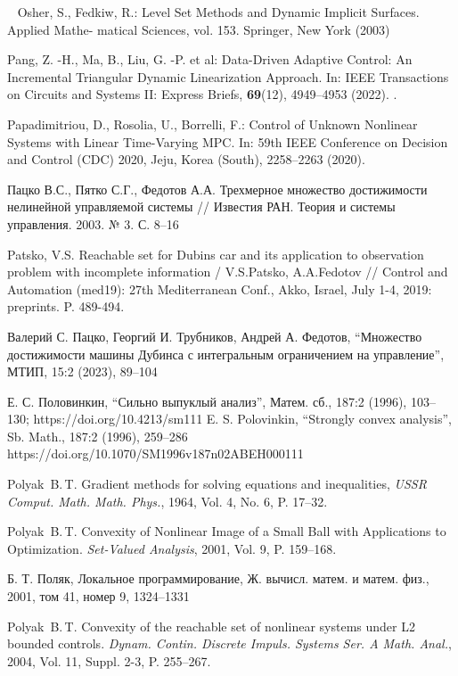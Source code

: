 \documentclass[../main.tex]{subfiles}
\begin{document}
\begin{thebibliography}{99}
Osher, S., Fedkiw, R.: Level Set Methods and Dynamic Implicit Surfaces. Applied Mathe-
matical Sciences, vol. 153. Springer, New York (2003)

Pang, Z. -H., Ma, B., Liu, G. -P.  et al: Data-Driven Adaptive Control: An Incremental Triangular Dynamic Linearization Approach. In: IEEE Transactions on Circuits and Systems II: Express Briefs, \textbf{69}(12), 4949--4953 (2022). .

Papadimitriou, D., Rosolia, U., Borrelli, F.: Control of Unknown Nonlinear Systems with Linear Time-Varying MPC. In: 59th IEEE Conference on Decision and Control (CDC) 2020, Jeju, Korea (South), 2258--2263 (2020). 

Пацко В.С., Пятко С.Г., Федотов А.А. Трехмерное множество достижимости нелинейной управляемой системы // Известия РАН. Теория и системы управления. 2003. № 3. С. 8--16

Patsko, V.S. Reachable set for Dubins car and its application to observation problem with incomplete information / V.S.Patsko, A.A.Fedotov // Control and Automation (med19): 27th Mediterranean Conf., Akko, Israel, July 1-4, 2019: preprints. P. 489-494. 

Валерий С. Пацко, Георгий И. Трубников, Андрей А. Федотов, “Множество достижимости машины Дубинса с интегральным ограничением на управление”, МТИП, 15:2 (2023), 89–104

Е. С. Половинкин, “Сильно выпуклый анализ”, Матем. сб., 187:2 (1996), 103–130;  https://doi.org/10.4213/sm111 
E. S. Polovinkin, “Strongly convex analysis”, Sb. Math., 187:2 (1996), 259–286 https://doi.org/10.1070/SM1996v187n02ABEH000111

Polyak~B.\,T. Gradient methods for solving equations and inequalities, \emph{USSR Comput. Math. Math. Phys.}, 1964, Vol. 4, No. 6, P. 17–32.

Polyak~B.\,T. Convexity of Nonlinear Image of a Small Ball with Applications to Optimization. \emph{Set-Valued Analysis}, 2001, Vol. 9, P. 159–168.

Б. Т. Поляк, Локальное программирование, Ж. вычисл. матем. и матем. физ., 2001, том 41, номер 9, 1324–1331

Polyak~B.\,T. Convexity of the reachable set of nonlinear systems under L2 bounded controls. \emph{Dynam. Contin. Discrete Impuls. Systems Ser. A Math. Anal.}, 2004, Vol. 11, Suppl. 2-3,  P. 255–267.



\end{thebibliography}
\end{document}
